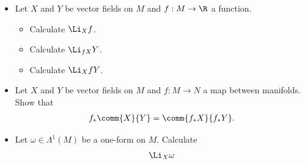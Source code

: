 \begin{Ebox}
  \begin{itemize}
  \item Let $X$ and $Y$ be vector fields on $M$ and $f:M\to\R$ a function.
    \begin{itemize}
    \item Calculate $\Li_{X}f$.
    \item Calculate $\Li_{fX}Y$.
    \item Calculate $\Li_{X}fY$.
    \end{itemize}
  \item  Let $X$ and $Y$ be vector fields on $M$ and $f:M\to N$ a map between manifolds. Show that
    \begin{align}
      f_*\comm{X}{Y} =\comm{f_*X}{f_*Y}.
      \label{diff-comm}
    \end{align}
  \item Let $\omega\in\Lambda^1(M)$ be a one-form on $M$. Calculate
    \begin{align}
      \Li_X \omega
    \end{align}
  \end{itemize}
\end{Ebox}
